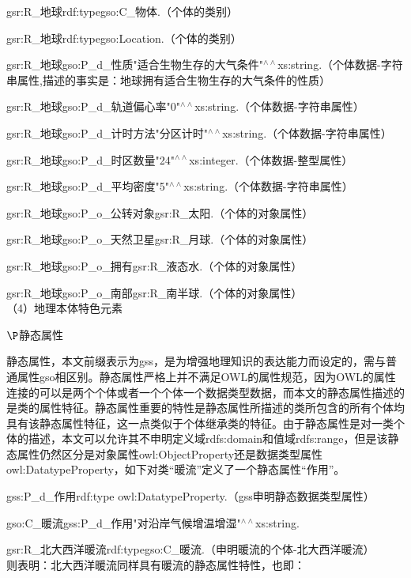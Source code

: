 gsr:R\_地球\quad rdf:type\quad gso:C\_物体\quad .（个体的类别）

gsr:R\_地球\quad rdf:type\quad gso:Location\quad .（个体的类别）

gsr:R\_地球\quad gso:P\_d\_性质\quad "适合生物生存的大气条件"$^{\land\land}$xs:string\quad .（个体数据-字符串属性,描述的事实是：地球拥有适合生物生存的大气条件的性质）

gsr:R\_地球\quad gso:P\_d\_轨道偏心率\quad "0"$^{\land\land}$xs:string\quad .（个体数据-字符串属性）

gsr:R\_地球\quad gso:P\_d\_计时方法\quad "分区计时"$^{\land\land}$xs:string\quad .（个体数据-字符串属性）

gsr:R\_地球\quad gso:P\_d\_时区数量\quad "24"$^{\land\land}$xs:integer\quad .（个体数据-整型属性）

gsr:R\_地球\quad gso:P\_d\_平均密度\quad "5"$^{\land\land}$xs:string\quad .（个体数据-字符串属性）

gsr:R\_地球\quad gso:P\_o\_公转对象\quad gsr:R\_太阳\quad .（个体的对象属性）

gsr:R\_地球\quad gso:P\_o\_天然卫星\quad gsr:R\_月球\quad .（个体的对象属性）

gsr:R\_地球\quad gso:P\_o\_拥有\quad gsr:R\_液态水\quad .（个体的对象属性）

gsr:R\_地球\quad gso:P\_o\_南部\quad gsr:R\_南半球\quad .（个体的对象属性）
\\

（4）地理本体特色元素

$\P$静态属性
		
静态属性，本文前缀表示为gss，是为增强地理知识的表达能力而设定的，需与普通属性gso相区别。静态属性严格上并不满足OWL的属性规范，因为OWL的属性连接的可以是两个个体或者一个个体一个数据类型数据，而本文的静态属性描述的是类的属性特征。静态属性重要的特性是静态属性所描述的类所包含的所有个体均具有该静态属性特征，这一点类似于个体继承类的特征。由于静态属性是对一类个体的描述，本文可以允许其不申明定义域rdfs:domain和值域rdfs:range，但是该静态属性仍然区分是对象属性owl:ObjectProperty还是数据类型属性owl:DatatypeProperty，如下对类“暖流”定义了一个静态属性“作用”。

gss:P\_d\_作用\quad rdf:type \quad owl:DatatypeProperty\quad .（gss申明静态数据类型属性）

gso:C\_暖流\quad gss:P\_d\_作用\quad "对沿岸气候增温增湿"$^{\land\land}$xs:string\quad .

gsr:R\_北大西洋暖流\quad rdf:type\quad gso:C\_暖流.（申明暖流的个体-北大西洋暖流）
\\
则表明：北大西洋暖流同样具有暖流的静态属性特性，也即：

